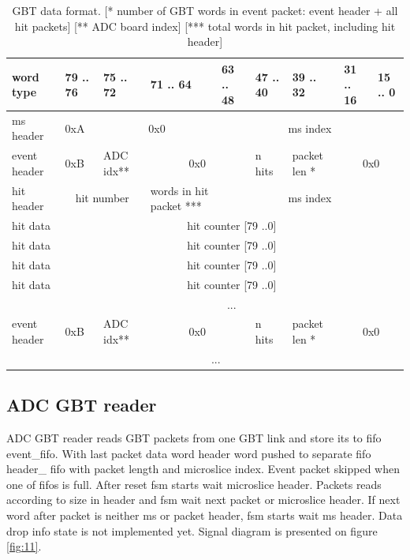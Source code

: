 \documentclass{article}
\begin{document}
\begin{table}[H]
\centering
\begin{tabular}{| l | l | l | l | l | l | l | l | l |}
\hline
word type & 79 .. 76 & 75 .. 72 & 71 .. 64 & 63 .. 48 & 47 .. 40 & 39 .. 32 & 31 .. 16 & 15 .. 0 \\ \hline
ms header & 0xA & \multicolumn{2}{c|}{0x0}  & \multicolumn{5}{c|}{ms index} \\ \hline
event header & 0xB & ADC idx** & \multicolumn{2}{c|}{0x0} & n hits & packet len * & \multicolumn{2}{c|}{0x0} \\ \hline
hit header & \multicolumn{2}{c|}{hit number} & words in hit packet *** & \multicolumn{5}{c|}{ms index} \\ \hline
hit data & \multicolumn{8}{c|}{hit counter [79 ..0]} \\ \hline
hit data & \multicolumn{8}{c|}{hit counter [79 ..0]} \\ \hline
hit data & \multicolumn{8}{c|}{hit counter [79 ..0]} \\ \hline
hit data & \multicolumn{8}{c|}{hit counter [79 ..0]} \\ \hline
  & \multicolumn{8}{c|}{ ... } \\ \hline

event header & 0xB & ADC idx** & \multicolumn{2}{c|}{0x0} & n hits & packet len * & \multicolumn{2}{c|}{0x0} \\ \hline
  & \multicolumn{7}{c|}{ ... } \\ \hline

\end{tabular}
\caption{GBT data format. [* number of GBT words in event packet: event header + all hit packets] [** ADC board index] [*** total words in hit packet, including hit header]\label{tab10}}
\end{table}













\subsection{ADC GBT reader}
ADC GBT reader reads GBT packets from one GBT link and store its to fifo event\_fifo. With last packet data word header word pushed to separate fifo header\_ fifo with packet length and microslice index. Event packet skipped when one of fifos is full. After reset fsm starts wait microslice header. Packets reads according to size in header and fsm wait next packet or microslice header. If next word after packet is neither ms or packet header, fsm starts wait ms header. Data drop info state is not implemented yet. Signal diagram is presented on figure \ref{fig:11}. 
\end{document}
